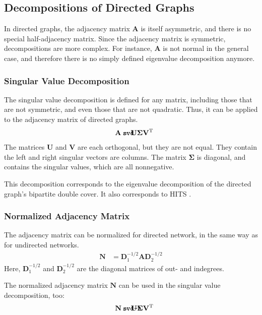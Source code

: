 \documentclass{article}
\def\mathnote#1{%
  \tag*{\rlap{\hspace\marginparsep\smash{\parbox[t]{\marginparwidth}{#1}}}}
}
\begin{document}
\subsection{Decompositions of Directed Graphs}
In directed graphs, the adjacency matrix $\mathbf A$ is itself
asymmetric, and there is no special half-adjacency matrix.  Since the
adjacency matrix is symmetric, decompositions are more complex.  For
instance, $\mathbf A$ is not normal in the general case, and therefore
there is no simply defined eigenvalue decomposition anymore. 

\subsubsection{Singular Value Decomposition}
The singular value decomposition is defined for any matrix, including
those that are not symmetric, and even those that are not quadratic.
Thus, it can be applied to the adjacency matrix of directed graphs. 
\begin{align}
  \mathnote{\texttt{svd}}
  \mathbf A &= \mathbf U \mathbf \Sigma \mathbf V^{\mathrm T}
\end{align}
The matrices $\mathbf U$ and $\mathbf V$ are each orthogonal, but they
are not equal.  They contain the left and right singular vectors are
columns.  The matrix $\mathbf \Sigma$ is diagonal, and contains the
singular values, which are all nonnegative. 

This decomposition corresponds to the eigenvalue decomposition of the
directed graph's bipartite double cover. 
It also corresponds to HITS \citep[Hyperlink-Induced Topic Search, ][]{b27}.

\subsubsection{Normalized Adjacency Matrix}
The adjacency matrix can be normalized for directed network, in the same
way as for undirected networks.
\begin{align}
  \mathbf N &= \mathbf D_1^{-1/2} \mathbf A \mathbf D_2^{-1/2}
\end{align}
Here, $\mathbf D_1^{-1/2}$ and $\mathbf D_2^{-1/2}$
are the diagonal matrices of out- and indegrees. 

The normalized adjacency matrix $\mathbf N$ can be used in the singular
value decomposition, too:
\begin{align}
  \mathnote{\texttt{svd-n}}
  \mathbf N &= \mathbf U \mathbf \Sigma \mathbf V^{\mathrm T}
\end{align}
\end{document}
